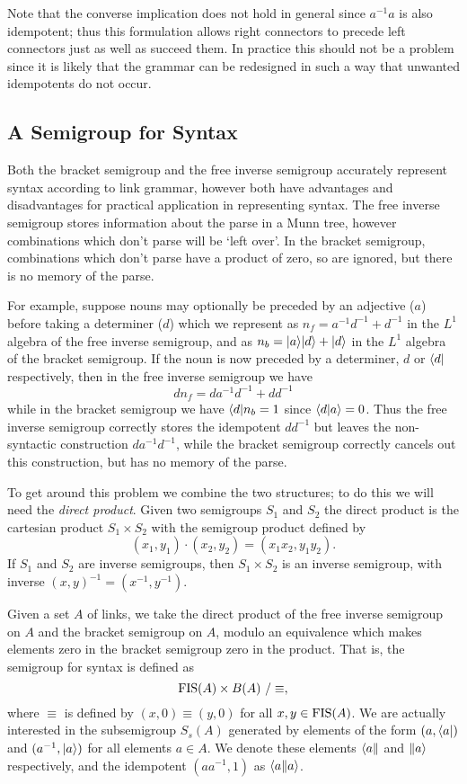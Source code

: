 Note that the converse implication does not hold in general since $a^{-1}a$ is also idempotent; thus this formulation allows right connectors to precede left connectors just as well as succeed them. In practice this should not be a problem since it is likely that the grammar can be redesigned in such a way that unwanted idempotents do not occur.

\subsection{A Semigroup for Syntax}

Both the bracket semigroup and the free inverse semigroup accurately represent syntax according to link grammar, however both have advantages and disadvantages for practical application in representing syntax. The free inverse semigroup stores information about the parse in a Munn tree, however combinations which don't parse will be `left over'. In the bracket semigroup, combinations which don't parse have a product of zero, so are ignored, but there is no memory of the parse.

For example, suppose nouns may optionally be preceded by an adjective ($a$) before taking a determiner ($d$) which we represent as $n_f = a^{-1}d^{-1} + d^{-1}$ in the $L^1$ algebra of the free inverse semigroup, and as $n_b = |a \rangle|d \rangle + |d \rangle$ in the $L^1$ algebra of the bracket semigroup. If the noun is now preceded by a determiner, $d$ or $\langle d|$ respectively, then in the free inverse semigroup we have
$$dn_f = da^{-1}d^{-1} + dd^{-1}$$
while in the bracket semigroup we have $\langle d|n_b = 1$ since $\langle d| a\rangle = 0$. Thus the free inverse semigroup correctly stores the idempotent $dd^{-1}$ but leaves the non-syntactic construction $da^{-1}d^{-1}$, while the bracket semigroup correctly cancels out this construction, but has no memory of the parse.

To get around this problem we combine the two structures; to do this we will need the \emph{direct product}. Given two semigroups $S_1$ and $S_2$ the direct product is the cartesian product $S_1 \times S_2$ with the semigroup product defined by
$$ (x_1,y_1)\cdot (x_2,y_2) = (x_1x_2,y_1y_2). $$
If $S_1$ and $S_2$ are inverse semigroups, then $S_1 \times S_2$ is an inverse semigroup, with inverse $(x,y)^{-1} = (x^{-1},y^{-1})$.

Given a set $A$ of links, we take the direct product of the free inverse semigroup on $A$ and the bracket semigroup on $A$, modulo an equivalence which makes elements zero in the bracket semigroup zero in the product. That is, the semigroup for syntax  is defined as
$$\operatorname{FIS}(A) \times B(A)\ / \equiv,$$
where $\equiv$ is defined by $(x,0) \equiv (y,0)$ for all $x,y \in \operatorname{FIS}(A)$. We are actually interested in the subsemigroup $S_s(A)$ generated by elements of the form $(a, \langle a|)$ and $(a^{-1},|a \rangle)$ for all elements $a \in A$. We denote these elements $\langle a\|$ and $\|a \rangle$ respectively, and the idempotent $(aa^{-1},1)$ as $\langle a\| a\rangle$.

